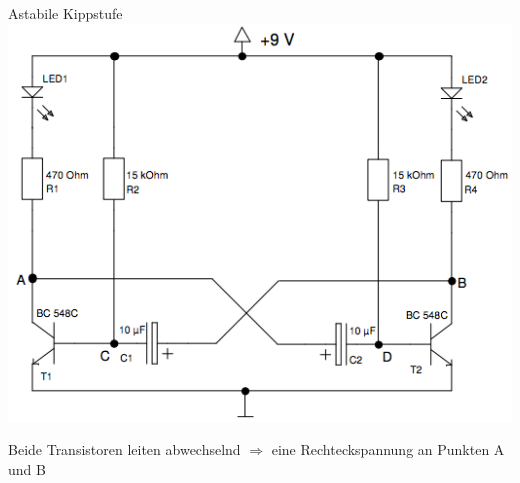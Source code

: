 \documentclass[compress,11pt]{beamer}
\begin{document}
\begin{frame}
\begin{block}{Astabile Kippstufe}
\centering
\includegraphics[width=.8\textwidth]{schaltbilder/blink.png}
\end{block}
\end{frame}
\begin{frame}
Beide Transistoren leiten abwechselnd $\Rightarrow$ eine Rechteckspannung an Punkten A und B
\end{frame}
\end{document}
